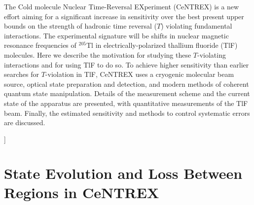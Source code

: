 \begin{@twocolumnfalse}
\begin{center}
		\begin{minipage}{.75\textwidth}
			\small
			The Cold molecule Nuclear Time-Reversal EXperiment (CeNTREX) is a new effort aiming for a significant increase in sensitivity over the best present upper bounds on the strength of hadronic time reversal ($T$) violating fundamental interactions. The experimental signature will be shifts in nuclear magnetic resonance frequencies of $^{205}$Tl in electrically-polarized thallium fluoride (TlF) molecules. Here we describe the motivation for studying these $T$-violating interactions and for using TlF to do so. To achieve higher sensitivity than earlier searches for $T$-violation in TlF, CeNTREX uses a cryogenic molecular beam source, optical state preparation and detection, and modern methods of coherent quantum state manipulation. Details of the measurement scheme and the current state of the apparatus are presented, with quantitative measurements of the TlF beam. Finally, the estimated sensitivity and methods to control systematic errors are discussed. 

		\end{minipage}

		\vspace{3ex}
	\end{center}
\end{@twocolumnfalse}
]

\section{State Evolution and Loss Between Regions in CeNTREX}
\label{sec:non_adiabatic_transitions}

%

